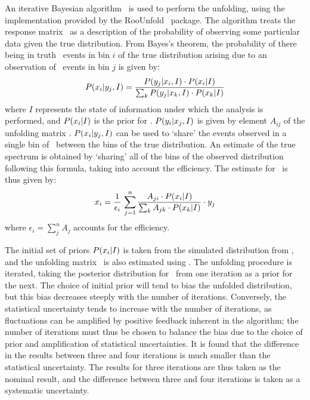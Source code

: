 An iterative Bayesian algorithm~\cite{2010arXiv1010.0632D} is used to perform
the unfolding, 
using the implementation provided by the {\sc
RooUnfold}~\cite{2011arXiv1105.1160A} package. The algorithm treats the response
matrix \unfA\ as a description of the probability of observing some particular data given the
true distribution. From Bayes's theorem, the probability of there being in truth 
\unfxi\ events in bin $i$ of the true distribution arising due to
an observation of \unfyj\ events in bin $j$ is given by:
\begin{equation}
P(x_i|y_j,I) = \frac{P(y_j|x_i,I)\cdot P(x_i|I)}{\sum_{k}P(y_j|x_k,I)\cdot P(x_k|I)}
\end{equation}
where $I$ represents the state of information under which the analysis is
performed, and $P(x_i|I)$ is the prior for \unfxi. $P(y_i|x_j,I)$ is
given by element $A_{ij}$ of the unfolding matrix \unfA. $P(x_i|y_j,I)$
can be used to `share' the events observed in a single bin of \unfy\ between the bins of the
true distribution. An estimate of the true spectrum is obtained by 
`sharing' all of the bins of the observed distribution following this formula, taking into
account the efficiency. The estimate for \unfxi\ is thus given by:
\begin{equation}
x_i = \frac{1}{\epsilon_{i}} \, \sum^{n}_{j=1} \frac{A_{ji} \cdot
P(x_i|I)}{\sum_{k} A_{jk} \cdot P(x_k|I)} \cdot y_j
\end{equation}
where $\epsilon_{i}=\sum^{n}_{j} A_{j}$ accounts for the efficiency.

The initial set of priors $P(x_i|I)$ is taken from the simulated distribution from
\mc, and the unfolding matrix \unfA\ is also estimated using \mcsim. The
unfolding
procedure is iterated, taking the posterior distribution for \unfx\ from one iteration as a
prior for the next. The choice of initial prior will tend to bias the unfolded
distribution, but this bias decreases steeply with the number of iterations.
Conversely, the
statistical uncertainty tends to increase with the number of iterations, as
fluctuations can be amplified by positive feedback inherent in the algorithm;
the number of iterations must thus be chosen to balance the bias due to the
choice of prior and amplification of statistical uncertainties. It is found that
the difference in the results between three and four iterations is much smaller than
the statistical uncertainty. The results for three iterations are thus taken as
the nominal result, and the difference between three and four iterations is
taken as a systematic uncertainty. 

